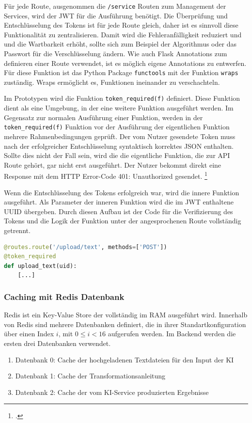 Für jede Route, ausgenommen die \texttt{/service} Routen zum Management der Services, wird der JWT für die Ausführung benötigt. Die Überprüfung und Entschlüsselung des Tokens ist für jede Route gleich, daher ist es sinnvoll diese Funktionalität zu zentralisieren. Damit wird die Fehleranfälligkeit reduziert und und die Wartbarkeit erhöht, sollte sich zum Beispiel der Algorithmus oder das Passwort für die Verschlüsselung ändern. Wie auch Flask Annotations zum definieren einer Route verwendet, ist es möglich eigene Annotations zu entwerfen. Für diese Funktion ist das Python Package \texttt{functools} mit der Funktion \texttt{wraps} zuständig. Wraps ermöglicht es, Funktionen ineinander zu verschachteln.

Im Prototypen wird die Funktion \texttt{token\_{}required(f)} definiert. Diese Funktion dient als eine Umgebung, in der eine weitere Funktion ausgeführt werden. Im Gegensatz zur normalen Ausführung einer Funktion, werden in der \texttt{token\_{}required(f)} Funktion vor der Ausführung der eigentlichen Funktion mehrere Rahmenbedingungen geprüft. Der vom Nutzer gesendete Token muss nach der erfolgreicher Entschlüsselung syntaktisch korrektes JSON enthalten. Sollte dies nicht der Fall sein, wird die die eigentliche Funktion, die zur API Route gehört, gar nicht erst ausgeführt. Der Nutzer bekommt direkt eine Response mit dem HTTP Error-Code 401: Unauthorized gesendet. \footcite{fielding1999rfc2616}

Wenn die Entschlüsselung des Tokens erfolgreich war, wird die innere Funktion ausgeführt. Als Parameter der inneren Funktion wird die im JWT enthaltene UUID übergeben. Durch diesen Aufbau ist der Code für die Verifizierung des Tokens und die Logik der Funktion unter der angesprochenen Route vollständig getrennt.

\begin{lstlisting}[language=Python]
@routes.route('/upload/text', methods=['POST'])
@token_required
def upload_text(uid):
    [...]
\end{lstlisting}

\subsubsection{Caching mit Redis Datenbank}
Redis ist ein Key-Value Store der vollständig im RAM ausgeführt wird. Innerhalb von Redis sind mehrere Datenbanken definiert, die in ihrer Standartkonfiguration über einen Index $i$, mit $0\leq{}i<16$ aufgerufen werden. Im Backend werden die ersten drei Datenbanken verwendet.
\begin{enumerate}
 \item Datenbank 0: Cache der hochgeladenen Textdateien für den Input der KI
 \item Datenbank 1: Cache der Transformationsanleitung
 \item Datenbank 2: Cache der vom KI-Service produzierten Ergebnisse
\end{enumerate} 

